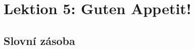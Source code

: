 \chapter{Lektion 5: Guten Appetit!}\label{NJ:chap_N1_L5}
  
  \section*{Slovní zásoba}

      


















































